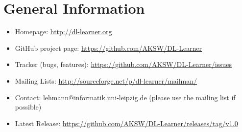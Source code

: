 \documentclass[a4paper,12pt]{scrartcl}
\begin{document}
\section{General Information}
\label{sec:general}
\label{sec:contact}

\begin{itemize}
 \item Homepage: \url{http://dl-learner.org}
 \item GitHub project page: \url{https://github.com/AKSW/DL-Learner}
 \item Tracker (bugs, features): \url{https://github.com/AKSW/DL-Learner/issues}
 \item Mailing Lists: \url{http://sourceforge.net/p/dl-learner/mailman/}
 \item Contact: lehmann@informatik.uni-leipzig.de (please use the mailing list if possible)
 \item Latest Release: \url{https://github.com/AKSW/DL-Learner/releases/tag/v1.0}
\end{itemize}

\nocite{*}


\end{document}
